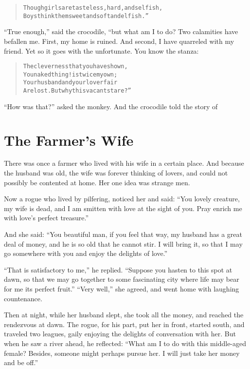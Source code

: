 \documentclass[article, twoside, 14pt]{memoir}
\renewenvironment{verbatim}{%
\begin{quote}%
\vskip -10pt%
\begin{alltt}\normalfont\large}{\end{alltt}%
\end{quote}%
\vskip -10pt
} %
\begin{document}
\begin{verbatim}
Though girls are tasteless, hard, and selfish,
Boys think them sweet and soft and elfish.”
\end{verbatim}
``True enough,'' said the crocodile, “but what am I to do? Two
calamities have befallen me. First, my home is ruined. And second,
I have quarreled with my friend. Yet so it goes with the
unfortunate. You know the stanza:

\begin{verbatim}
The cleverness that you have shown,
You naked thing! is twice my own;
Your husband and your lover fair
Are lost. But why this vacant stare?”
\end{verbatim}
``How was that?'' asked the monkey. And the crocodile told the
story of

\chapter{The Farmer's Wife}

\label{s74}

There was once a farmer who lived with his wife in a certain
place. And because the husband was old, the wife was forever
thinking of lovers, and could not possibly be contented at home.
Her one idea was strange men.

Now a rogue who lived by pilfering, noticed her and said:
``You lovely creature, my wife is dead, and I am smitten with love at the sight of you. Pray enrich me with love's perfect treasure.''

And she said:
``You beautiful man, if you feel that way, my husband has a great deal of money, and he is so old that he cannot stir. I will bring it, so that I may go somewhere with you and enjoy the delights of love.''

``That is satisfactory to me,'' he replied.
``Suppose you hasten to this spot at dawn, so that we may go together to some fascinating city where life may bear for me its perfect fruit.''
``Very well,'' she agreed, and went home with laughing
countenance.

Then at night, while her husband slept, she took all the money, and
reached the rendezvous at dawn. The rogue, for his part, put her in
front, started south, and traveled two leagues, gaily enjoying the
delights of conversation with her. But when he saw a river ahead,
he reflected:
``What am I to do with this middle-aged female? Besides, someone might perhaps pursue her. I will just take her money and be off.''
\end{document}
